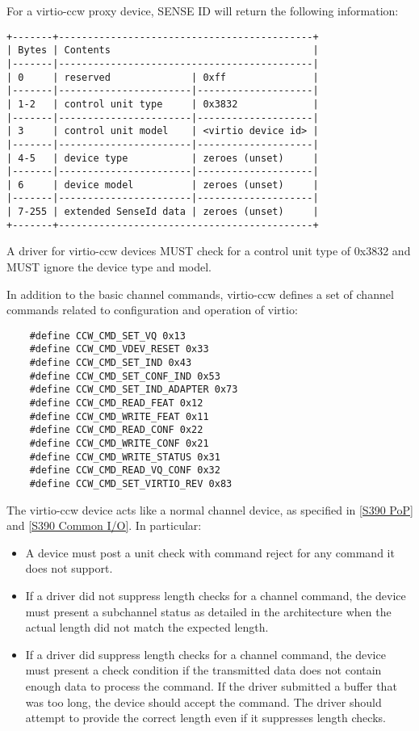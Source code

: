For a virtio-ccw proxy device, SENSE ID will return the following
information:

\begin{verbatim}
+-------+--------------------------------------------+
| Bytes | Contents                                   |
|-------|--------------------------------------------|
| 0     | reserved              | 0xff               |
|-------|-----------------------|--------------------|
| 1-2   | control unit type     | 0x3832             |
|-------|-----------------------|--------------------|
| 3     | control unit model    | <virtio device id> |
|-------|-----------------------|--------------------|
| 4-5   | device type           | zeroes (unset)     |
|-------|-----------------------|--------------------|
| 6     | device model          | zeroes (unset)     |
|-------|-----------------------|--------------------|
| 7-255 | extended SenseId data | zeroes (unset)     |
+-------+--------------------------------------------+
\end{verbatim}

A driver for virtio-ccw devices MUST check for a control unit
type of 0x3832 and MUST ignore the device type and model.

In addition to the basic channel commands, virtio-ccw defines a
set of channel commands related to configuration and operation of
virtio:

\begin{lstlisting}
	#define CCW_CMD_SET_VQ 0x13
	#define CCW_CMD_VDEV_RESET 0x33
	#define CCW_CMD_SET_IND 0x43
	#define CCW_CMD_SET_CONF_IND 0x53
	#define CCW_CMD_SET_IND_ADAPTER 0x73
	#define CCW_CMD_READ_FEAT 0x12
	#define CCW_CMD_WRITE_FEAT 0x11
	#define CCW_CMD_READ_CONF 0x22
	#define CCW_CMD_WRITE_CONF 0x21
	#define CCW_CMD_WRITE_STATUS 0x31
	#define CCW_CMD_READ_VQ_CONF 0x32
	#define CCW_CMD_SET_VIRTIO_REV 0x83
\end{lstlisting}

The virtio-ccw device acts like a normal channel device, as specified
in \hyperref[intro:S390 PoP]{[S390 PoP]} and \hyperref[intro:S390 Common I/O]{[S390 Common I/O]}. In particular:

\begin{itemize}
\item A device must post a unit check with command reject for any command
  it does not support.

\item If a driver did not suppress length checks for a channel command,
  the device must present a subchannel status as detailed in the
  architecture when the actual length did not match the expected length.

\item If a driver did suppress length checks for a channel command, the
  device must present a check condition if the transmitted data does
  not contain enough data to process the command. If the driver submitted
  a buffer that was too long, the device should accept the command.
  The driver should attempt to provide the correct length even if it
  suppresses length checks.
\end{itemize}


